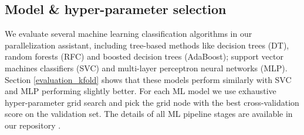 \subsection{Model \& hyper-parameter selection}
\label{model_selection}
\quad We evaluate several machine learning classification algorithms in our parallelization assistant, including tree-based methods like decision trees (DT), random forests (RFC) and boosted decision trees (AdaBoost); support vector machines classifiers (SVC) and multi-layer perceptron neural networks (MLP). Section \ref{evaluation_kfold} shows that these models perform similarly with SVC and MLP performing slightly better. For each ML model we use exhaustive hyper-parameter grid search and pick the grid node with the best cross-validation score on the validation set.  The details of all ML pipeline stages are available in our repository \cite{assistant-repo}.
